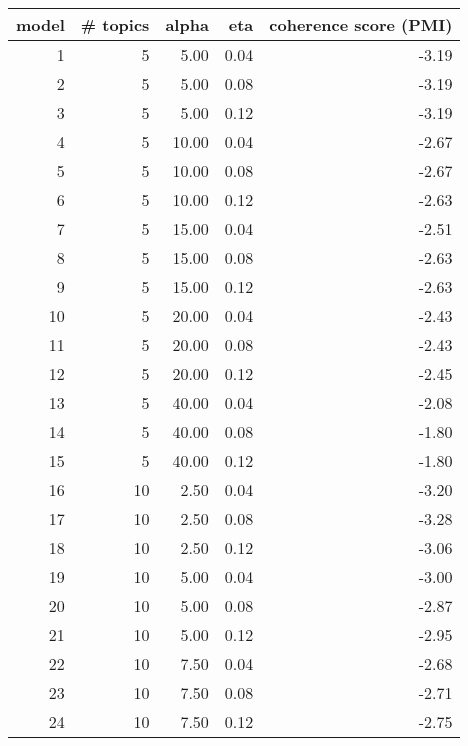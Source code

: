 \begin{tabular}{rrrrr}
\toprule
 model &  \# topics &  alpha &  eta &  coherence score (PMI) \\
\midrule
     1 &         5 &   5.00 & 0.04 &                  -3.19 \\
     2 &         5 &   5.00 & 0.08 &                  -3.19 \\
     3 &         5 &   5.00 & 0.12 &                  -3.19 \\
     4 &         5 &  10.00 & 0.04 &                  -2.67 \\
     5 &         5 &  10.00 & 0.08 &                  -2.67 \\
     6 &         5 &  10.00 & 0.12 &                  -2.63 \\
     7 &         5 &  15.00 & 0.04 &                  -2.51 \\
     8 &         5 &  15.00 & 0.08 &                  -2.63 \\
     9 &         5 &  15.00 & 0.12 &                  -2.63 \\
    10 &         5 &  20.00 & 0.04 &                  -2.43 \\
    11 &         5 &  20.00 & 0.08 &                  -2.43 \\
    12 &         5 &  20.00 & 0.12 &                  -2.45 \\
    13 &         5 &  40.00 & 0.04 &                  -2.08 \\
    14 &         5 &  40.00 & 0.08 &                  -1.80 \\
    15 &         5 &  40.00 & 0.12 &                  -1.80 \\
    16 &        10 &   2.50 & 0.04 &                  -3.20 \\
    17 &        10 &   2.50 & 0.08 &                  -3.28 \\
    18 &        10 &   2.50 & 0.12 &                  -3.06 \\
    19 &        10 &   5.00 & 0.04 &                  -3.00 \\
    20 &        10 &   5.00 & 0.08 &                  -2.87 \\
    21 &        10 &   5.00 & 0.12 &                  -2.95 \\
    22 &        10 &   7.50 & 0.04 &                  -2.68 \\
    23 &        10 &   7.50 & 0.08 &                  -2.71 \\
    24 &        10 &   7.50 & 0.12 &                  -2.75 \\

\end{tabular}
